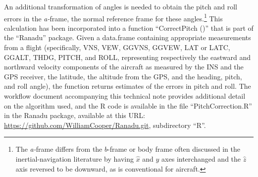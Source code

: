 \documentclass[12pt,twoside,english,12pt,twoside,english]{article}\usepackage[]{graphicx}\usepackage[]{color}
\let\OrgIndex\index
\renewcommand*{\index}[1]{\OrgIndex{#1}}
\begin{document}
An additional transformation
of angles is needed to obtain the pitch
and roll errors in the
\emph{a-}frame, the normal reference frame for these angles.\footnote{The \emph{a-}frame differs from the $b$-frame or body frame
often discussed in the inertial-navigation literature by having $\hat{x}$
and $\hat{y}$ axes interchanged
and the $\hat{z}$ axis reversed to be downward, as is conventional
for aircraft.} This calculation has been incorporated into a function
``CorrectPitch ()'' that is part of the ``Ranadu'' package.
Given a data.frame containing appropriate measurements
from a flight (specifically, VNS,
VEW,
GGVNS,
GGVEW,
LAT
or LATC, GGALT,
THDG,
PITCH,
and ROLL,
representing respectively the eastward and northward velocity components
of the aircraft as measured by the INS
and the GPS receiver, the latitude, the altitude
from the GPS, and the heading, pitch,
and roll angle), the function returns estimates of the errors
in pitch and roll. The workflow document
accompanying this technical note provides additional detail on the
algorithm
used, and the R code is available in the file ``PitchCorrection.R''
in the Ranadu
package, available at this URL:
\url{https://github.com/WilliamCooper/Ranadu.git}, subdirectory ``R''.
\end{document}
